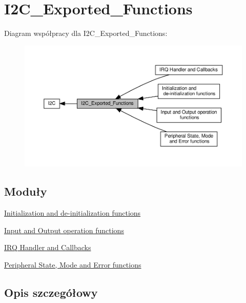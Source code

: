 \hypertarget{group___i2_c___exported___functions}{}\section{I2\+C\+\_\+\+Exported\+\_\+\+Functions}
\label{group___i2_c___exported___functions}
Diagram współpracy dla I2\+C\+\_\+\+Exported\+\_\+\+Functions\+:\nopagebreak
\begin{figure}[H]
\begin{center}
\leavevmode
\includegraphics[width=350pt]{group___i2_c___exported___functions}
\end{center}
\end{figure}
\subsection*{Moduły}
\begin{DoxyCompactItemize}
\item 
\hyperlink{group___i2_c___exported___functions___group1}{Initialization and de-\/initialization functions}
\item 
\hyperlink{group___i2_c___exported___functions___group2}{Input and Output operation functions}
\item 
\hyperlink{group___i2_c___i_r_q___handler__and___callbacks}{I\+R\+Q Handler and Callbacks}
\item 
\hyperlink{group___i2_c___exported___functions___group3}{Peripheral State, Mode and Error functions}
\end{DoxyCompactItemize}


\subsection{Opis szczegółowy}
